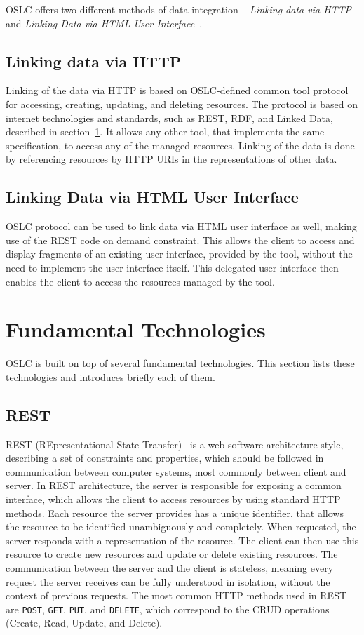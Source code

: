 OSLC offers two different methods of data integration -- \emph{Linking data via HTTP} and \emph{Linking Data via HTML User Interface} \cite{oslc_primary_integration_techniques}.


\subsection*{Linking data via HTTP}
Linking of the data via HTTP is based on OSLC-defined common tool protocol for accessing, creating, updating, and deleting resources. The protocol is based on internet technologies and standards, such as REST, RDF, and Linked Data, described in section \ref{sec:oslc_fundamental_technologies}. It allows any other tool, that implements the same specification, to access any of the managed resources. Linking of the data is done by referencing resources by HTTP URIs in the representations of other data.

\subsection*{Linking Data via HTML User Interface}
\label {sec:oslc_linking_data_via_html_user_interface}
OSLC protocol can be used to link data via HTML user interface as well, making use of the REST code on demand constraint. This allows the client to access and display fragments of an existing user interface, provided by the tool, without the need to implement the user interface itself. This delegated user interface then enables the client to access the resources managed by the tool.

\section{Fundamental Technologies}
\label {sec:oslc_fundamental_technologies}
OSLC is built on top of several fundamental technologies. This section lists these technologies and introduces briefly each of them.

\subsection*{REST}
REST (REpresentational State Transfer) \cite{rest} is a web software architecture style, describing a set of constraints and properties, which should be followed in communication between computer systems, most commonly between client and server. In REST architecture, the server is responsible for exposing a common interface, which allows the client to access resources by using standard HTTP methods. Each resource the server provides has a unique identifier, that allows the resource to be identified unambiguously and completely. When requested, the server responds with a representation of the resource. The client can then use this resource to create new resources and update or delete existing resources. The communication between the server and the client is stateless, meaning every request the server receives can be fully understood in isolation, without the context of previous requests. The most common HTTP methods used in REST are \texttt{POST}, \texttt{GET}, \texttt{PUT}, and \texttt{DELETE}, which correspond to the CRUD operations (Create, Read, Update, and Delete).

